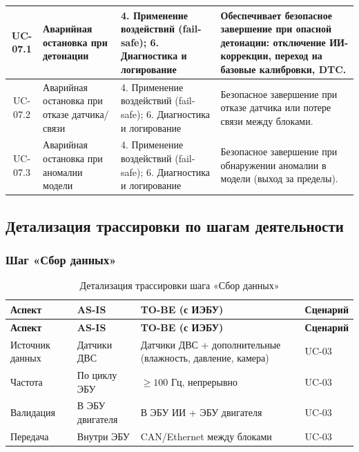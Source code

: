 \documentclass[14pt, a4paper]{extarticle}
\begin{document}
{\begin{xltabular}{\textwidth}{|c|L|L|L|}
					UC-07.1 & Аварийная остановка при детонации & 4. Применение воздействий (fail-safe); 6. Диагностика и логирование & Обеспечивает безопасное завершение при опасной детонации: отключение ИИ-коррекции, переход на базовые калибровки, DTC. \\
					\hline
					UC-07.2 & Аварийная остановка при отказе датчика/связи & 4. Применение воздействий (fail-safe); 6. Диагностика и логирование & Безопасное завершение при отказе датчика или потере связи между блоками. \\
					\hline
					UC-07.3 & Аварийная остановка при аномалии модели & 4. Применение воздействий (fail-safe); 6. Диагностика и логирование & Безопасное завершение при обнаружении аномалии в модели (выход за пределы). \\
					\hline
				\end{xltabular}}
				
				\subsection{Детализация трассировки по шагам деятельности}
				
				\subsubsection{Шаг «Сбор данных»}
				
				{\fontsize{9}{11}\selectfont
					\begin{xltabular}{\textwidth}{|L|L|L|L|}
					\caption{Детализация трассировки шага «Сбор данных»}\label{tab:trace-collect}\\
					\hline
					\textbf{Аспект} & \textbf{AS-IS} & \textbf{TO-BE (с ИЭБУ)} & \textbf{Сценарий} \\
					\hline
					\endfirsthead
					\hline
					\textbf{Аспект} & \textbf{AS-IS} & \textbf{TO-BE (с ИЭБУ)} & \textbf{Сценарий} \\
					\hline
					\endhead
					\hline
					\endfoot
					\hline
					\endlastfoot
					Источник данных & Датчики ДВС & Датчики ДВС + дополнительные (влажность, давление, камера) & UC-03 \\
					\hline
					Частота & По циклу ЭБУ & \(\geq 100\) Гц, непрерывно & UC-03 \\
					\hline
					Валидация & В ЭБУ двигателя & В ЭБУ ИИ + ЭБУ двигателя & UC-03 \\
					\hline
					Передача & Внутри ЭБУ & CAN/Ethernet между блоками & UC-03 \\
					\hline
				\end{xltabular}}
				
\end{document}
